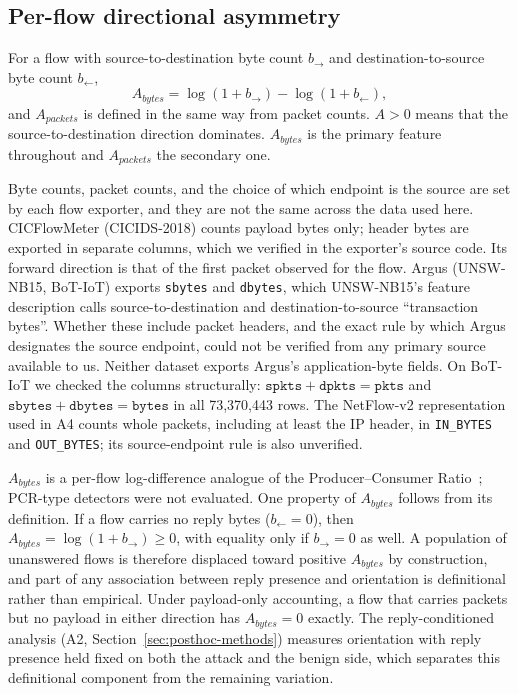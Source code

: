 \documentclass[preprint,12pt]{elsarticle}
\begin{document}
\subsection{Per-flow directional asymmetry}\label{sec:feature}

For a flow with source-to-destination byte count $b_{\rightarrow}$ and destination-to-source byte count $b_{\leftarrow}$,
\begin{equation}
A_{bytes} = \log(1+b_{\rightarrow}) - \log(1+b_{\leftarrow}),
\end{equation}
and $A_{packets}$ is defined in the same way from packet counts. $A>0$ means that the source-to-destination direction dominates. $A_{bytes}$ is the primary feature throughout and $A_{packets}$ the secondary one.

Byte counts, packet counts, and the choice of which endpoint is the source are set by each flow exporter, and they are not the same across the data used here. CICFlowMeter (CICIDS-2018) counts payload bytes only; header bytes are exported in separate columns, which we verified in the exporter's source code. Its forward direction is that of the first packet observed for the flow. Argus (UNSW-NB15, BoT-IoT) exports \texttt{sbytes} and \texttt{dbytes}, which UNSW-NB15's feature description calls source-to-destination and destination-to-source ``transaction bytes''. Whether these include packet headers, and the exact rule by which Argus designates the source endpoint, could not be verified from any primary source available to us. Neither dataset exports Argus's application-byte fields. On BoT-IoT we checked the columns structurally: $\texttt{spkts}+\texttt{dpkts}=\texttt{pkts}$ and $\texttt{sbytes}+\texttt{dbytes}=\texttt{bytes}$ in all 73{,}370{,}443 rows. The NetFlow-v2 representation used in A4 counts whole packets, including at least the IP header, in \texttt{IN\_BYTES} and \texttt{OUT\_BYTES}; its source-endpoint rule is also unverified.

$A_{bytes}$ is a per-flow log-difference analogue of the Producer--Consumer Ratio~\cite{bullard2014pcr}; PCR-type detectors were not evaluated. One property of $A_{bytes}$ follows from its definition. If a flow carries no reply bytes ($b_{\leftarrow}=0$), then $A_{bytes}=\log(1+b_{\rightarrow})\ge 0$, with equality only if $b_{\rightarrow}=0$ as well. A population of unanswered flows is therefore displaced toward positive $A_{bytes}$ by construction, and part of any association between reply presence and orientation is definitional rather than empirical. Under payload-only accounting, a flow that carries packets but no payload in either direction has $A_{bytes}=0$ exactly. The reply-conditioned analysis (A2, Section~\ref{sec:posthoc-methods}) measures orientation with reply presence held fixed on both the attack and the benign side, which separates this definitional component from the remaining variation.
\end{document}
